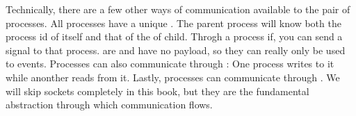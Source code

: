 Technically, there are a few other ways of communication available to the pair of processes. All processes have a unique . The parent process will know both the process id of itself and that of the of child. Throgh a process if, you can send a signal to that process.  are  and have no payload, so they can really only be used to  events. Processes can also communicate through : One process writes to it while anonther reads from it. Lastly, processes can communicate through . We will skip sockets completely in this book, but they are the fundamental abstraction through which  communication flows.

